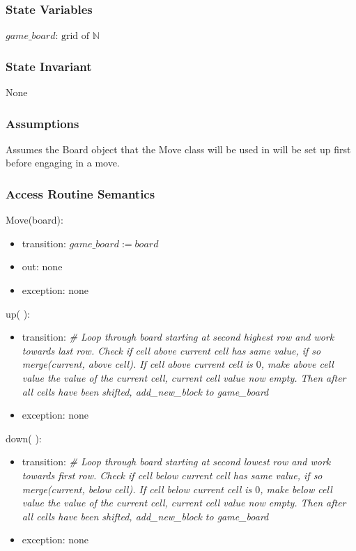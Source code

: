 \documentclass[12pt]{article}
\begin{document}
\subsubsection* {State Variables}

$\mathit{game\_board}$: $\text{grid of } \mathbb{N}$

\subsubsection* {State Invariant}

None

\subsubsection* {Assumptions}

Assumes the Board object that the Move class will be used in will be set up first before engaging in a move.  

\subsubsection* {Access Routine Semantics}

\noindent Move(board):
\begin{itemize}
\item transition: $\mathit{game\_board} := \mathit{board}$
\item out: none
\item exception: none
\end{itemize}

\noindent up( ):
\begin{itemize}
\item transition: \textit{\# Loop through board starting at second highest row and work towards last row. Check if cell above current cell has same value, if so merge(current, above cell). If cell above current cell is $0$, make above cell value the value of the current cell, current cell value now empty. Then after all cells have been shifted, add\_new\_block to game\_board} ~\\
\item exception: none
\end{itemize}

\noindent down( ):
\begin{itemize}
\item transition: \textit{\# Loop through board starting at second lowest row and work towards first row. Check if cell below current cell has same value, if so merge(current, below cell). If cell below current cell is $0$, make below cell value the value of the current cell, current cell value now empty. Then after all cells have been shifted, add\_new\_block to game\_board} ~\\
\item exception: none
\end{itemize}
\end{document}
